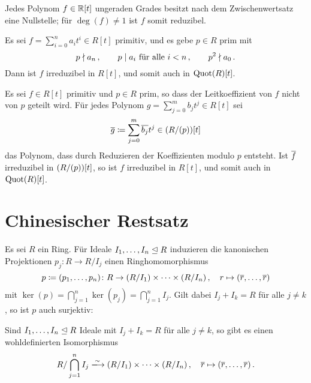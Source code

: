 \begin{example}
  Jedes Polynom $f \in \mathbb{R}[t]$ ungeraden Grades besitzt nach dem Zwischenwertsatz eine Nullstelle;
  für $\deg(f) \neq 1$ ist $f$ somit reduzibel.
\end{example}

\begin{proposition}[Eisenstein]
  Es sei $f = \sum_{i=0}^n a_i t^i \in R[t]$ primitiv, und es gebe $p \in R$ prim mit
  \[
    p \mathrel{\nmid} a_n \,,
    \qquad
    \text{$p \mathrel{|} a_i$ für alle $i < n$} \,,
    \qquad
    p^2 \mathrel{\nmid} a_0 \,.
  \]
  Dann ist $f$ irreduzibel in $R[t]$, und somit auch in $\operatorname{Quot}(R)[t]$.
\end{proposition}

\begin{proposition}[Reduktionskriterium]
  Es sei $f \in R[t]$ primitiv und $p \in R$ prim, so dass der Leitkoeffizient von $f$ nicht von $p$ geteilt wird.
  Für jedes Polynom $g = \sum_{j=0}^m b_j t^j \in R[t]$ sei
  \[
              \overline{g}
    \coloneqq  \sum_{j=0}^m \overline{b_j} t^j
    \in       (R/(p))[t]
  \]
  das Polynom, dass durch Reduzieren der Koeffizienten modulo $p$ entsteht.
  Ist $\overline{f}$ irreduzibel in $(R/(p))[t]$, so ist $f$ irreduzibel in $R[t]$, und somit auch in $\operatorname{Quot}(R)[t]$.
\end{proposition}







\section{Chinesischer Restsatz}

Es sei $R$ ein Ring.
Für Ideale $I_1, \dotsc, I_n \mathrel{\trianglelefteq} R$ induzieren die kanonischen Projektionen $p_j \colon R \to R/I_j$ einen Ringhomomorphismus
\[
            p
  \coloneqq  (p_1, \dotsc, p_n)
  \colon    R
  \to       (R/I_1) \times \dotsb \times (R/I_n) \,,
  \quad     r
  \mapsto   (\overline{r}, \dotsc, \overline{r})
\]
mit $\ker(p) = \bigcap_{j=1}^n \ker(p_j) = \bigcap_{j=1}^n I_j$.
Gilt dabei $I_j + I_k = R$ für alle $j \neq k$, so ist $p$ auch surjektiv:

\begin{theorem}
  Sind $I_1, \dotsc, I_n \mathrel{\trianglelefteq} R$ Ideale mit $I_j + I_k = R$ für alle $j \neq k$, so gibt es einen wohldefinierten Isomorphismus
  \[
                            R / \bigcap_{j=1}^n I_j
    \xlongrightarrow{\sim}  (R/I_1) \times \dotsb \times (R/I_n) \,,
    \quad                   \class{r}
    \mapsto                 (\class{r}, \dotsc, \class{r}) \,.
  \]
\end{theorem}

